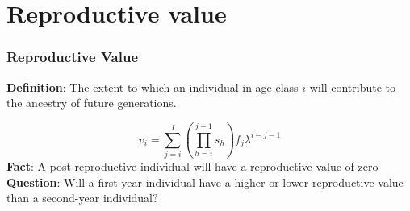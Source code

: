 \documentclass[color=usenames,dvipsnames]{beamer}\usepackage[]{graphicx}\usepackage[]{color}
\begin{document}

















\section{Reproductive value}







\begin{frame}
  \frametitle{Reproductive Value}
  \large
  {\bf Definition}: The extent to which an individual in age class
  $i$ will contribute to the ancestry of future generations. \par
  \pause
  \large
  \[
    v_i = \sum_{j=i}^{I}\left(\prod_{h=i}^{j-1}s_h\right)f_j\lambda^{i-j-1}
  \]
  \pause
  \vfill
  {\bf Fact}: A post-reproductive individual will have a reproductive value of zero \\
  \pause
  \vspace{1cm}
  {\bf Question}: Will a first-year individual have a higher or lower
  reproductive value than a second-year individual?
\end{frame}
\end{document}
